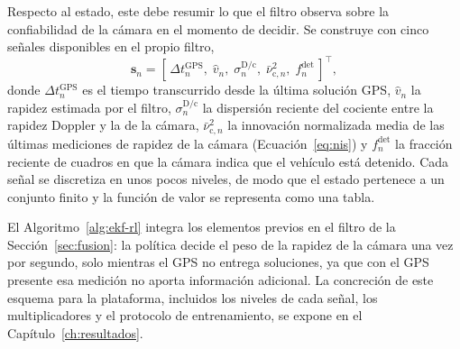 Respecto al estado, este debe resumir lo que el filtro observa sobre la confiabilidad de la cámara en el momento de decidir.
Se construye con cinco señales disponibles en el propio filtro,
\begin{equation}
\mathbf{s}_n = \left[\, \Delta t^{\mathrm{GPS}}_n,\; \hat{v}_n,\; \sigma^{\mathrm{D/c}}_n,\; \bar{\nu}^{2}_{\mathrm{c},n},\; f^{\mathrm{det}}_n \,\right]^{\top},
\label{eq:estado-rl}
\end{equation}
donde $\Delta t^{\mathrm{GPS}}_n$ es el tiempo transcurrido desde la última solución GPS, $\hat{v}_n$ la rapidez estimada por el filtro, $\sigma^{\mathrm{D/c}}_n$ la dispersión reciente del cociente entre la rapidez Doppler y la de la cámara, $\bar{\nu}^{2}_{\mathrm{c},n}$ la innovación normalizada media de las últimas mediciones de rapidez de la cámara (Ecuación~\eqref{eq:nis}) y $f^{\mathrm{det}}_n$ la fracción reciente de cuadros en que la cámara indica que el vehículo está detenido.
Cada señal se discretiza en unos pocos niveles, de modo que el estado pertenece a un conjunto finito y la función de valor se representa como una tabla.

El Algoritmo~\ref{alg:ekf-rl} integra los elementos previos en el filtro de la Sección~\ref{sec:fusion}: la política decide el peso de la rapidez de la cámara una vez por segundo, solo mientras el GPS no entrega soluciones, ya que con el GPS presente esa medición no aporta información adicional.
La concreción de este esquema para la plataforma, incluidos los niveles de cada señal, los multiplicadores y el protocolo de entrenamiento, se expone en el Capítulo~\ref{ch:resultados}.

